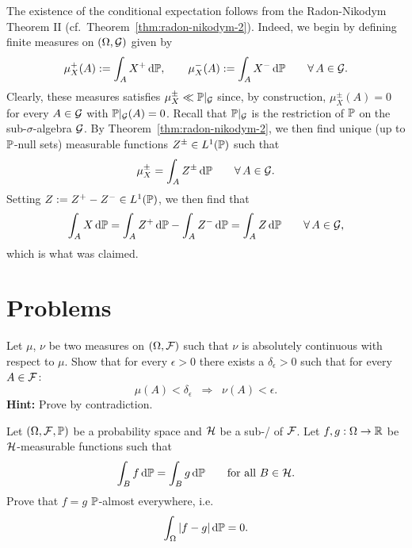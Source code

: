 The existence of the conditional expectation follows from the Radon-Nikodym Theorem II (cf.\ Theorem~\ref{thm:radon-nikodym-2}). Indeed, we begin by defining finite measures on $(\Omega,\mathcal G)$ given by
\[
	\mu_X^+(A) := \int_A X^+\,\mathrm{d}\mathbb P,\qquad \mu_X^-(A) := \int_A X^-\,\mathrm{d}\mathbb P\qquad\forall\,A\in\mathcal G.
\]
Clearly, these measures satisfies $\mu_X^\pm\ll \mathbb P|_{\mathcal G}$ since, by construction, $\mu_X^\pm(A)=0$ for every $A\in\mathcal G$ with $\mathbb P|_{\mathcal G}(A)=0$. Recall that $\mathbb P|_{\mathcal G}$ is the restriction of $\mathbb P$ on the sub-$\sigma$-algebra $\mathcal G$. By Theorem~\ref{thm:radon-nikodym-2}, we then find unique (up to $\mathbb P$-null sets) measurable functions $Z^\pm\in L^1(\mathbb P)$ such that
\[
	\mu_X^\pm = \int_A Z^\pm\,\mathrm{d}\mathbb P\qquad\forall\,A\in\mathcal G.
\]
Setting $Z:= Z^+-Z^-\in L^1(\mathbb P)$, we then find that
\[
	\int_A X\,\mathrm{d}\mathbb P = \int_A Z^+\,\mathrm{d}\mathbb P - \int_A Z^-\,\mathrm{d}\mathbb P = \int_A Z\,\mathrm{d}\mathbb P\qquad \forall\,A\in\mathcal G,
\]
which is what was claimed.


\section{Problems}

\begin{problem}
	Let $\mu$, $\nu$ be two measures on $(\Omega, \mathcal F)$ such that $\nu$ is absolutely continuous with respect to $\mu$. Show that for every $\epsilon > 0$ there exists a $\delta_\epsilon > 0$ such that for every $A \in \mathcal F$:
	\[
		\mu(A) < \delta_\epsilon\;\;\Longrightarrow\;\; \nu(A) < \epsilon.
	\]
	\textbf{Hint:} Prove by contradiction.
\end{problem}


\begin{problem}
Let $(\Omega, \mathcal F, \mathbb P)$ be a probability space and $\mathcal H$ be a sub-\sigalg/ of $\mathcal F$. Let $f, g : \Omega \to \mathbb R$ be $\mathcal H$-measurable functions such that
\[
	\int_B f \, \mathrm{d} \mathbb P = \int_B g \, \mathrm{d} \mathbb P\qquad\text{for all $B\in \mathcal H$}.
\]
Prove that $f=g$ $\mathbb P$-almost everywhere, i.e.
\[
	\int_\Omega |f - g| \, \mathrm{d} \mathbb P = 0.
\]
\end{problem}


